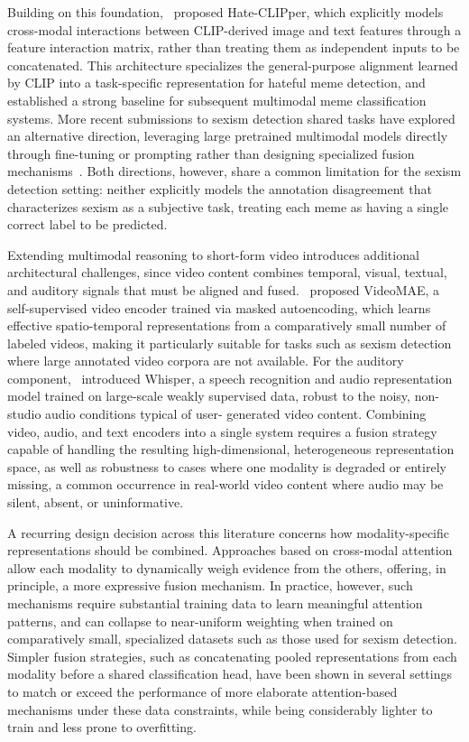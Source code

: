 Building on this foundation,~\cite{kumar2022hateclipper} proposed Hate-CLIPper, which
explicitly models cross-modal interactions between CLIP-derived image and text features
through a feature interaction matrix, rather than treating them as independent inputs to be
concatenated. This architecture specializes the general-purpose alignment learned by CLIP
into a task-specific representation for hateful meme detection, and established a strong
baseline for subsequent multimodal meme classification systems. More recent submissions
to sexism detection shared tasks have explored an alternative direction, leveraging large
pretrained multimodal models directly through fine-tuning or prompting rather than designing specialized fusion mechanisms~\cite{aiwizards2026}. Both directions, however, share
a common limitation for the sexism detection setting: neither explicitly models the annotation disagreement that characterizes sexism as a subjective task, treating each meme as
having a single correct label to be predicted.

Extending multimodal reasoning to short-form video introduces additional architectural
challenges, since video content combines temporal, visual, textual, and auditory signals that must be aligned and fused.~\cite{tong2022videomae} proposed VideoMAE,
a self-supervised video encoder trained via masked autoencoding, which learns effective
spatio-temporal representations from a comparatively small number of labeled videos, making it particularly suitable for tasks such as sexism detection where large annotated video
corpora are not available. For the auditory component,~\cite{radford2023whisper} introduced Whisper, a speech recognition and audio representation model trained on large-scale
weakly supervised data, robust to the noisy, non-studio audio conditions typical of user-
generated video content. Combining video, audio, and text encoders into a single system
requires a fusion strategy capable of handling the resulting high-dimensional, heterogeneous representation space, as well as robustness to cases where one modality is degraded
or entirely missing, a common occurrence in real-world video content where audio may
be silent, absent, or uninformative.

A recurring design decision across this literature concerns how modality-specific representations should be combined. Approaches based on cross-modal attention allow each
modality to dynamically weigh evidence from the others, offering, in principle, a more
expressive fusion mechanism. In practice, however, such mechanisms require substantial
training data to learn meaningful attention patterns, and can collapse to near-uniform
weighting when trained on comparatively small, specialized datasets such as those used for
sexism detection. Simpler fusion strategies, such as concatenating pooled representations
from each modality before a shared classification head, have been shown in several settings
to match or exceed the performance of more elaborate attention-based mechanisms under
these data constraints, while being considerably lighter to train and less prone to overfitting.

